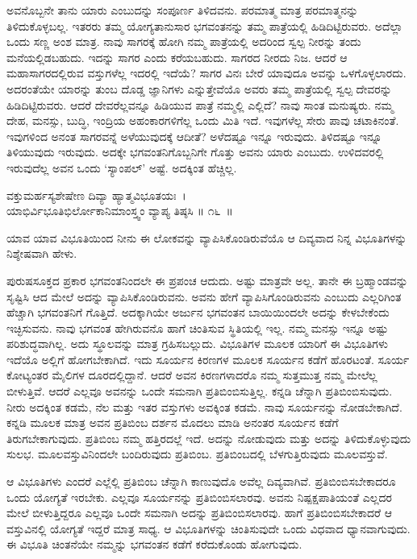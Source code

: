 ಅವನೊಬ್ಬನೇ ತಾನು ಯಾರು ಎಂಬುದನ್ನು ಸಂಪೂರ್ಣ ತಿಳಿದವನು. ಪರಮಾತ್ಮ ಮಾತ್ರ ಪರಮಾತ್ಮನನ್ನು ತಿಳಿದುಕೊಳ್ಳಬಲ್ಲ. ಇತರರು ತಮ್ಮ ಯೋಗ್ಯತಾನುಸಾರ ಭಗವಂತನನ್ನು ತಮ್ಮ ಪಾತ್ರೆಯಲ್ಲಿ ಹಿಡಿದಿಟ್ಟಿರುವರು. ಅದೆಲ್ಲಾ ಒಂದು ಸಣ್ಣ ಅಂಶ ಮಾತ್ರ. ನಾವು ಸಾಗರಕ್ಕೆ ಹೋಗಿ ನಮ್ಮ ಪಾತ್ರೆಯಲ್ಲಿ ಅದರಿಂದ ಸ್ವಲ್ಪ ನೀರನ್ನು ತಂದು ಮನೆಯಲ್ಲಿಡಬಹುದು. ಇದನ್ನು ಸಾಗರ ಎಂದು ಕರೆಯಬಹುದು. ಸಾಗರದ ನೀರದು ನಿಜ. ಆದರೆ ಆ ಮಹಾಸಾಗರದಲ್ಲಿರುವ ವಸ್ತುಗಳೆಲ್ಲ ಇದರಲ್ಲಿ ಇದೆಯೆ? ಸಾಗರ ವಿನಃ ಬೇರೆ ಯಾವುದೂ ಅವನ್ನು ಒಳಗೊಳ್ಳಲಾರದು. ಅದರಂತೆಯೇ ಯಾರನ್ನು ತುಂಬ ದೊಡ್ಡ ಜ್ಞಾನಿಗಳು ಎನ್ನುತ್ತೇವೆಯೊ ಅವರು ತಮ್ಮ ಪಾತ್ರೆಯಲ್ಲಿ ಸ್ವಲ್ಪ ದೇವರನ್ನು ಹಿಡಿದಿಟ್ಟಿರುವರು. ಆದರೆ ದೇವರೆಲ್ಲವನ್ನೂ ಹಿಡಿಯುವ ಪಾತ್ರೆ ನಮ್ಮಲ್ಲಿ ಎಲ್ಲಿದೆ? ನಾವು ಸಾಂತ ಮನುಷ್ಯರು. ನಮ್ಮ ದೇಹ, ಮನಸ್ಸು, ಬುದ್ಧಿ, ಇಂದ್ರಿಯ ಅಹಂಕಾರಗಳಿಗೆಲ್ಲ ಒಂದು ಮಿತಿ ಇದೆ. ಇವುಗಳೆಲ್ಲ ಸೇರು ಪಾವು ಚಟಾಕಿನಂತೆ. ಇವುಗಳಿಂದ ಅನಂತ ಸಾಗರವನ್ನೆ ಅಳೆಯುವುದಕ್ಕೆ ಆದೀತೆ? ಅಳೆದಷ್ಟೂ ಇನ್ನೂ ಇರುವುದು. ತಿಳಿದಷ್ಟೂ ಇನ್ನೂ ತಿಳಿಯುವುದು ಇರುವುದು. ಅದಕ್ಕೇ ಭಗವಂತನಿಗೊಬ್ಬನಿಗೇ ಗೊತ್ತು ಅವನು ಯಾರು ಎಂಬುದು. ಉಳಿದವರಲ್ಲಿ ಇರುವುದೆಲ್ಲ ಅವನ ಒಂದು ‘ಸ್ಯಾಂಪಲ್​’ ಅಷ್ಟೆ. ಅದಕ್ಕಿಂತ ಹೆಚ್ಚಿಲ್ಲ.

\begin{shloka}
ವಕ್ತುಮರ್ಹಸ್ಯಶೇಷೇಣ ದಿವ್ಯಾ ಹ್ಯಾತ್ಮವಿಭೂತಯಃ~।\\ಯಾಭಿರ್ವಿಭೂತಿಭಿರ್ಲೋಕಾನಿಮಾಂಸ್ತ್ವಂ ವ್ಯಾಪ್ಯ ತಿಷ್ಠಸಿ \hfill॥ ೧೬~॥
\end{shloka}

\begin{artha}
ಯಾವ ಯಾವ ವಿಭೂತಿಯಿಂದ ನೀನು ಈ ಲೋಕವನ್ನು ವ್ಯಾಪಿಸಿಕೊಂಡಿರುವೆಯೊ ಆ ದಿವ್ಯವಾದ ನಿನ್ನ ವಿಭೂತಿಗಳನ್ನು ನಿಶ್ಶೇಷವಾಗಿ ಹೇಳು.
\end{artha}

ಪುರುಷಸೂಕ್ತದ ಪ್ರಕಾರ ಭಗವಂತನಿಂದಲೇ ಈ ಪ್ರಪಂಚ ಆದುದು. ಅಷ್ಟು ಮಾತ್ರವೇ ಅಲ್ಲ. ತಾನೇ ಈ ಬ್ರಹ್ಮಾಂಡವನ್ನು ಸೃಷ್ಟಿಸಿ ಆದ ಮೇಲೆ ಅದನ್ನು ವ್ಯಾಪಿಸಿಕೊಂಡಿರುವನು. ಅವನು ಹೇಗೆ ವ್ಯಾಪಿಸಿಗೊಂಡಿರುವನು ಎಂಬುದು ಎಲ್ಲರಿಗಿಂತ ಹೆಚ್ಚಾಗಿ ಭಗವಂತನಿಗೆ ಗೊತ್ತಿದೆ. ಅದಕ್ಕಾಗಿಯೇ ಅರ್ಜುನ ಭಗವಂತನ ಬಾಯಿಯಿಂದಲೇ ಅದನ್ನು ಕೇಳಬೇಕೆಂದು ಇಚ್ಛಿಸುವನು. ನಾವು ಭಗವಂತ ಹೇಗಿರುವನೊ ಹಾಗೆ ಚಿಂತಿಸುವ ಸ್ಥಿತಿಯಲ್ಲಿ ಇಲ್ಲ. ನಮ್ಮ ಮನಸ್ಸು ಇನ್ನೂ ಅಷ್ಟು ಪರಿಶುದ್ಧವಾಗಿಲ್ಲ. ಅದು ಸ್ಥೂಲವನ್ನು ಮಾತ್ರ ಗ್ರಹಿಸಬಲ್ಲುದು. ವಿಭೂತಿಗಳ ಮೂಲಕ ಯಾರಿಗೆ ಈ ವಿಭೂತಿಗಳು ಇದೆಯೊ ಅಲ್ಲಿಗೆ ಹೋಗಬೇಕಾಗಿದೆ. ಇದು ಸೂರ್ಯನ ಕಿರಣಗಳ ಮೂಲಕ ಸೂರ್ಯನ ಕಡೆಗೆ ಹೊರಟಂತೆ. ಸೂರ್ಯ ಕೋಟ್ಯಂತರ ಮೈಲಿಗಳ ದೂರದಲ್ಲಿದ್ದಾನೆ. ಆದರೆ ಅವನ ಕಿರಣಗಳಾದರೊ ನಮ್ಮ ಸುತ್ತಮುತ್ತ ನಮ್ಮ ಮೇಲೆಲ್ಲ ಬೀಳುತ್ತಿವೆ. ಆದರೆ ಎಲ್ಲವೂ ಅವನನ್ನು ಒಂದೇ ಸಮನಾಗಿ ಪ್ರತಿಬಿಂಬಿಸುತ್ತಿಲ್ಲ. ಕನ್ನಡಿ ಚೆನ್ನಾಗಿ ಪ್ರತಿಬಿಂಬಿಸುವುದು. ನೀರು ಅದಕ್ಕಿಂತ ಕಡಮೆ, ನೆಲ ಮತ್ತು ಇತರ ವಸ್ತುಗಳು ಅವಕ್ಕಿಂತ ಕಡಮೆ. ನಾವು ಸೂರ್ಯನನ್ನು ನೋಡಬೇಕಾಗಿದೆ. ಕನ್ನಡಿ ಮೂಲಕ ಮಾತ್ರ ಅವನ ಪ್ರತಿಬಿಂಬ ದರ್ಶನ ಮೊದಲು ಮಾಡಿ ಅನಂತರ ಸೂರ್ಯನ ಕಡೆಗೆ ತಿರುಗಬೇಕಾಗುವುದು. ಪ್ರತಿಬಿಂಬ ನಮ್ಮ ಹತ್ತಿರದಲ್ಲೆ ಇದೆ. ಅದನ್ನು ನೋಡುವುದು ಮತ್ತು ಅದನ್ನು ತಿಳಿದುಕೊಳ್ಳುವುದು ಸುಲಭ. ಮೂಲವಸ್ತುವಿನಿಂದಲೇ ಬಂದಿರುವುದು ಪ್ರತಿಬಿಂಬ. ಪ್ರತಿಬಿಂಬದಲ್ಲಿ ಬೆಳಗುತ್ತಿರುವುದು ಮೂಲವಸ್ತುವೆ.

ಆ ವಿಭೂತಿಗಳು ಎಂದರೆ ಎಲ್ಲೆಲ್ಲಿ ಪ್ರತಿಬಿಂಬ ಚೆನ್ನಾಗಿ ಕಾಣುವುದೊ ಅವೆಲ್ಲ ದಿವ್ಯವಾಗಿವೆ. ಪ್ರತಿಬಿಂಬಿಸಬೇಕಾದರೂ ಒಂದು ಯೋಗ್ಯತೆ ಇರಬೇಕು. ಎಲ್ಲವೂ ಸೂರ್ಯನನ್ನು ಪ್ರತಿಬಿಂಬಿಸ\-ಲಾರವು. ಅವನು ನಿಷ್ಪಕ್ಷಪಾತಿಯಂತೆ ಎಲ್ಲದರ ಮೇಲೆ ಬೀಳುತ್ತಿದ್ದರೂ ಎಲ್ಲವೂ ಒಂದೇ ಸಮನಾಗಿ ಅದನ್ನು ಪ್ರತಿಬಿಂಬಿಸಲಾರವು. ಹಾಗೆ ಪ್ರತಿಬಿಂಬಿಸಬೇಕಾದರೆ ಆ ವಸ್ತುವಿನಲ್ಲಿ ಯೋಗ್ಯತೆ ಇದ್ದರೆ ಮಾತ್ರ ಸಾಧ್ಯ. ಆ ವಿಭೂತಿಗಳನ್ನು ಚಿಂತಿಸುವುದೇ ಒಂದು ವಿಧವಾದ ಧ್ಯಾನವಾಗುವುದು. ಈ ವಿಭೂತಿ ಚಿಂತನೆಯೇ ನಮ್ಮನ್ನು ಭಗವಂತನ ಕಡೆಗೆ ಕರೆದುಕೊಂಡು ಹೋಗುವುದು.


